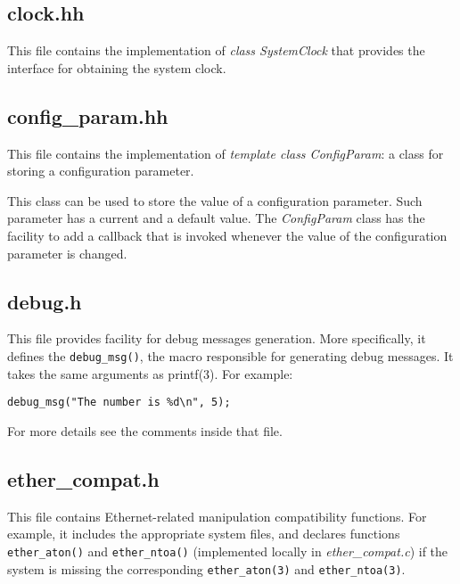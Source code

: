 \documentclass[11pt]{article}
\begin{document}
\subsection{clock.hh}

This file contains the implementation of \emph{class SystemClock}
that provides the interface for obtaining the system clock.

\subsection{config\_param.hh}

This file contains the implementation of \emph{template class
ConfigParam}: a class for storing a configuration parameter.

This class can be used to store the value of a configuration parameter.
Such parameter has a current and a default value.
The \emph{ConfigParam} class has the facility to add a callback that is
invoked whenever the value of the configuration parameter is changed.

\subsection{debug.h}

This file provides facility for debug messages generation.
More specifically, it defines the \verb=debug_msg()=, the macro
responsible for generating debug messages.
It takes the same arguments as printf(3). For example:

\begin{verbatim}
debug_msg("The number is %d\n", 5);
\end{verbatim}

For more details see the comments inside that file.

\subsection{ether\_compat.h}

This file contains Ethernet-related manipulation compatibility
functions. For example, it includes the appropriate system files,
and declares functions \verb=ether_aton()= and \verb=ether_ntoa()=
(implemented locally in \emph{ether\_compat.c}) if the system is missing
the corresponding \verb=ether_aton(3)= and \verb=ether_ntoa(3)=.
\end{document}
